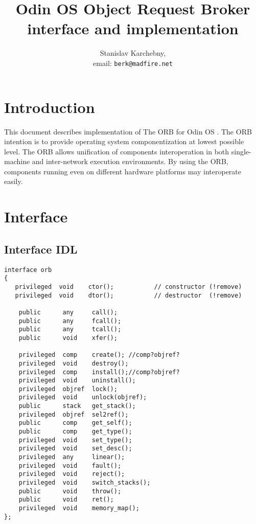 \documentclass[onecolumn]{article}
\begin{document}
\title{\Large\bf Odin OS Object Request Broker interface and implementation}
\author{Stanislav Karchebny, \\
        email: \texttt{berk@madfire.net}}
\maketitle

\section{Introduction}
\label{sec-intro}

\par This document describes implementation of The ORB for Odin OS \cite{odin}.
The ORB intention is to provide operating system componentization at lowest possible level.
The ORB allows unification of components interoperation in both single-machine and inter-network
execution environments. By using the ORB, components running even on different hardware platforms
may interoperate easily.

\section{Interface}
\label{sec-if}

\subsection{Interface IDL}
\label{sec-if-idl}

\small
\begin{verbatim}
interface orb
{
   privileged  void    ctor();           // constructor (!remove)
   privileged  void    dtor();           // destructor  (!remove)

	public      any     call();
	public      any     fcall();
	public      any     tcall();
	public      void    xfer();
	
	privileged  comp    create(); //comp?objref?
	privileged  void    destroy();
	privileged  comp    install();//comp?objref?
	privileged  void    uninstall();
	privileged  objref  lock();
	privileged  void    unlock(objref);
	public      stack   get_stack();
	privileged  objref  sel2ref();
	public      comp    get_self();
	public      comp    get_type();
	privileged  void    set_type();
	privileged  void    set_desc();
	privileged  any     linear();
	privileged  void    fault();
	privileged  void    reject();
	privileged  void    switch_stacks();
	public      void    throw();
	public      void    ret();
	privileged  void    memory_map();
};
\end{verbatim}
\normalsize
\end{document}
